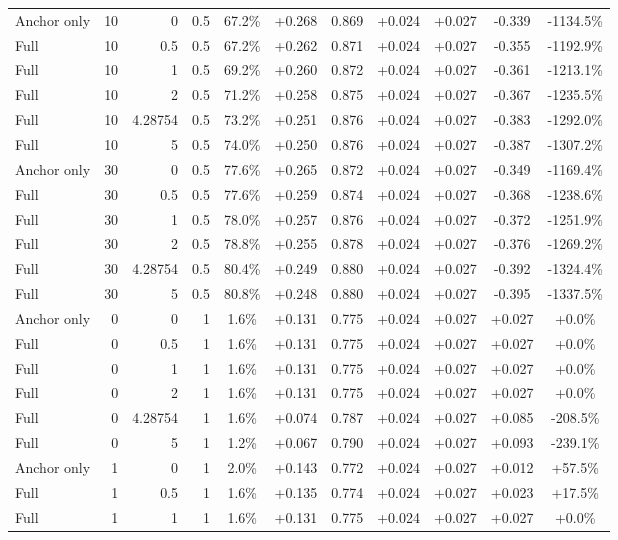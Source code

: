\begin{table}[htbp]
\begin{tabular}{lrrrccccccc}
Anchor only & 10 & 0 & 0.5 & 67.2\% & +0.268 & 0.869 & +0.024 & +0.027 & -0.339 & -1134.5\% \\
Full & 10 & 0.5 & 0.5 & 67.2\% & +0.262 & 0.871 & +0.024 & +0.027 & -0.355 & -1192.9\% \\
Full & 10 & 1 & 0.5 & 69.2\% & +0.260 & 0.872 & +0.024 & +0.027 & -0.361 & -1213.1\% \\
Full & 10 & 2 & 0.5 & 71.2\% & +0.258 & 0.875 & +0.024 & +0.027 & -0.367 & -1235.5\% \\
Full & 10 & 4.28754 & 0.5 & 73.2\% & +0.251 & 0.876 & +0.024 & +0.027 & -0.383 & -1292.0\% \\
Full & 10 & 5 & 0.5 & 74.0\% & +0.250 & 0.876 & +0.024 & +0.027 & -0.387 & -1307.2\% \\
Anchor only & 30 & 0 & 0.5 & 77.6\% & +0.265 & 0.872 & +0.024 & +0.027 & -0.349 & -1169.4\% \\
Full & 30 & 0.5 & 0.5 & 77.6\% & +0.259 & 0.874 & +0.024 & +0.027 & -0.368 & -1238.6\% \\
Full & 30 & 1 & 0.5 & 78.0\% & +0.257 & 0.876 & +0.024 & +0.027 & -0.372 & -1251.9\% \\
Full & 30 & 2 & 0.5 & 78.8\% & +0.255 & 0.878 & +0.024 & +0.027 & -0.376 & -1269.2\% \\
Full & 30 & 4.28754 & 0.5 & 80.4\% & +0.249 & 0.880 & +0.024 & +0.027 & -0.392 & -1324.4\% \\
Full & 30 & 5 & 0.5 & 80.8\% & +0.248 & 0.880 & +0.024 & +0.027 & -0.395 & -1337.5\% \\
Anchor only & 0 & 0 & 1 & 1.6\% & +0.131 & 0.775 & +0.024 & +0.027 & +0.027 & +0.0\% \\
Full & 0 & 0.5 & 1 & 1.6\% & +0.131 & 0.775 & +0.024 & +0.027 & +0.027 & +0.0\% \\
Full & 0 & 1 & 1 & 1.6\% & +0.131 & 0.775 & +0.024 & +0.027 & +0.027 & +0.0\% \\
Full & 0 & 2 & 1 & 1.6\% & +0.131 & 0.775 & +0.024 & +0.027 & +0.027 & +0.0\% \\
Full & 0 & 4.28754 & 1 & 1.6\% & +0.074 & 0.787 & +0.024 & +0.027 & +0.085 & -208.5\% \\
Full & 0 & 5 & 1 & 1.2\% & +0.067 & 0.790 & +0.024 & +0.027 & +0.093 & -239.1\% \\
Anchor only & 1 & 0 & 1 & 2.0\% & +0.143 & 0.772 & +0.024 & +0.027 & +0.012 & +57.5\% \\
Full & 1 & 0.5 & 1 & 1.6\% & +0.135 & 0.774 & +0.024 & +0.027 & +0.023 & +17.5\% \\
Full & 1 & 1 & 1 & 1.6\% & +0.131 & 0.775 & +0.024 & +0.027 & +0.027 & +0.0\% \\

\end{tabular}
\end{table}
